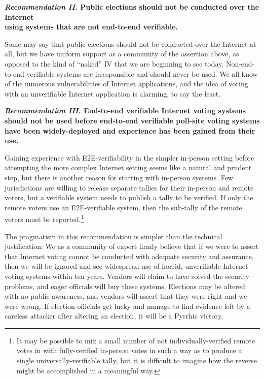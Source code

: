 \begin{center}
  \textbf{\emph{Recommendation II.} Public elections should not be
    conducted over the Internet\\
    using systems that are not end-to-end verifiable.}
\end{center}

Some may say that public elections should not be conducted over the
Internet at all, but we have uniform support as a community of the
assertion above, as opposed to the kind of ``naked'' IV that we are
beginning to see today. Non-end-to-end verifiable systems are
irresponsible and should never be used. We all know of the numerous
vulnerabilities of Internet applications, and the idea of voting with
an unverifiable Internet application is alarming, to say the least.

\begin{center}
  \textbf{\emph{Recommendation III.} End-to-end verifiable Internet
    voting systems should not be used before end-to-end verifiable
    poll-site voting systems have been widely-deployed and experience
    has been gained from their use.}
\end{center}

Gaining experience with E2E-verifiability in the simpler in-person
setting before attempting the more complex Internet setting seems like
a natural and prudent step, but there is another reason for starting
with in-person systems.  Few jurisdictions are willing to release
separate tallies for their in-person and remote voters, but a
verifiable system needs to publish a tally to be verified.  If only
the remote voters use an E2E-verifiable system, then the sub-tally of
the remote voters must be reported.\footnote{It may be possible to mix
  a small number of not individually-verified remote votes in with
  fully-verified in-person votes in such a way as to produce a single
  universally-verifiable tally, but it is difficult to imagine how the
  reverse might be accomplished in a meaningful way.}
 
The pragmatism in this recommendation is simpler than the technical
justification: We as a community of expert firmly believe that if we
were to assert that Internet voting cannot be conducted with adequate
security and assurance, then we will be ignored and see widespread use
of horrid, unverifiable Internet voting systems within ten years.
Vendors will claim to have solved the security problems, and eager
officials will buy these systems.  Elections may be altered with no
public awareness, and vendors will assert that they were right and we
were wrong.  If election officials get lucky and manage to find
evidence left by a careless attacker after altering an election, it
will be a Pyrrhic victory.
 
